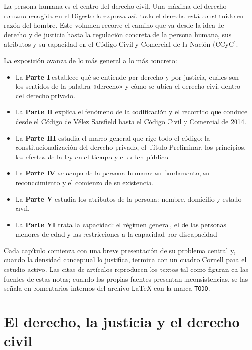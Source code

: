 \documentclass[12pt,oneside]{book}
\begin{document}
La persona humana es el centro del derecho civil. Una máxima del derecho romano recogida en el Digesto lo expresa así: todo el derecho está constituido en razón del hombre. Este volumen recorre el camino que va desde la idea de derecho y de justicia hasta la regulación concreta de la persona humana, sus atributos y su capacidad en el Código Civil y Comercial de la Nación (CCyC).

La exposición avanza de lo más general a lo más concreto:

\begin{itemize}
\item La \textbf{Parte I} establece qué se entiende por derecho y por justicia, cuáles son los sentidos de la palabra «derecho» y cómo se ubica el derecho civil dentro del derecho privado.
\item La \textbf{Parte II} explica el fenómeno de la codificación y el recorrido que conduce desde el Código de Vélez Sarsfield hasta el Código Civil y Comercial de 2014.
\item La \textbf{Parte III} estudia el marco general que rige todo el código: la constitucionalización del derecho privado, el Título Preliminar, los principios, los efectos de la ley en el tiempo y el orden público.
\item La \textbf{Parte IV} se ocupa de la persona humana: su fundamento, su reconocimiento y el comienzo de su existencia.
\item La \textbf{Parte V} estudia los atributos de la persona: nombre, domicilio y estado civil.
\item La \textbf{Parte VI} trata la capacidad: el régimen general, el de las personas menores de edad y las restricciones a la capacidad por discapacidad.
\end{itemize}

Cada capítulo comienza con una breve presentación de su problema central y, cuando la densidad conceptual lo justifica, termina con un cuadro Cornell para el estudio activo. Las citas de artículos reproducen los textos tal como figuran en las fuentes de estas notas; cuando las propias fuentes presentan inconsistencias, se las señala en comentarios internos del archivo \LaTeX{} con la marca \texttt{TODO}.

\part{El derecho, la justicia y el derecho civil}
\end{document}

